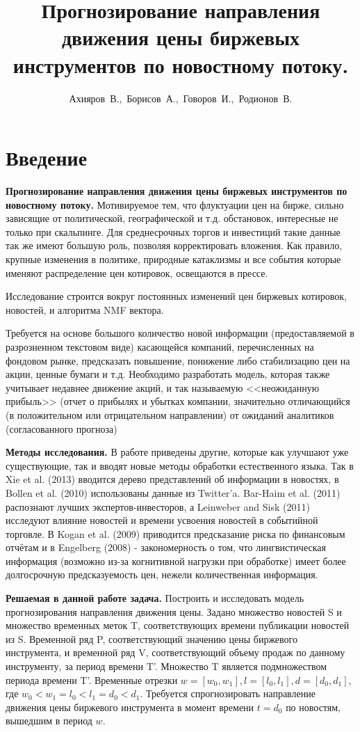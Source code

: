 \documentclass[12pt, twoside]{article}
\title
    [Прогнозирование направления движения цены биржевых инструментов по новостному потоку ] %
    {Прогнозирование направления движения цены биржевых инструментов по новостному потоку.}
\author
    {Ахияров~В.,\, Борисов~А.,\, Говоров~И.,\, Родионов~В. } %
\begin{document}
\maketitle

\section{Введение}

\textbf{Прогнозирование направления движения цены биржевых инструментов по новостному потоку.}
Мотивируемое тем, что флуктуации цен на бирже, сильно зависящие от политической, географической и т.д. обстановок,  интересные не только при скальпинге. Для среднесрочных торгов и инвестиций такие данные так же имеют большую роль, позволяя корректировать вложения. Как правило, крупные изменения в политике, природные катаклизмы и все события которые именяют распределение цен котировок, освещаются в прессе. 

Исследование строится вокруг постоянных изменений цен биржевых котировок, новостей, и алгоритма NMF вектора.

Требуется на основе большого количество новой информации (предоставляемой в разрозненном текстовом виде)  касающейся компаний, перечисленных на фондовом рынке, предсказать повышение, понижение либо стабилизацию цен на акции, ценные бумаги и т.д. Необходимо разработать модель, которая также учитывает недавнее движение акций, и так называемую <<неожиданную прибыль>> (отчет о прибылях и убытках компании, значительно отличающийся (в положительном или отрицательном направлении) от ожиданий аналитиков (согласованного прогноза)

\textbf{Методы исследования.}
В работе приведены другие, которые как улучшают уже существующие, так и вводят новые методы обработки естественного языка.
Так в Xie et al. (2013) вводится дерево представлений об информации в новостях, в Bollen et al. (2010) использованы данные из Twitter'a.
Bar-Haim et al. (2011) распознают лучших экспертов-инвесторов, а Leinweber and Sisk (2011) исследуют влияние новостей и времени усвоения новостей в событийной торговле.
В Kogan et al. (2009) приводится предсказание риска по финансовым отчётам и в Engelberg (2008) - закономерность о том, что лингвистическая информация (возможно из-за когнитивной нагрузки при обработке) имеет более долгосрочную предсказуемость цен, нежели количественная информация.

\textbf{Решаемая в данной работе задача.}
Построить и исследовать модель прогнозирования направления движения цены. Задано множество новостей S и множество временных меток T, соответствующих времени публикации новостей из S. Временной ряд P, соответствующий значению цены биржевого инструмента, и временной ряд V, соответствующий объему продаж по данному инструменту, за период времени T'. Множество T является подмножеством периода времени T'. Временные отрезки $w=[w_0, w_1], l=[l_0, l_1], d=[d_0, d_1]$, где $w_0 < w_1 = l_0 < l_1 = d_0 < d_1$. Требуется спрогнозировать направление движения цены биржевого инструмента в момент времени $t = d_0$ по новостям, вышедшим в период $w$.
\end{document}
